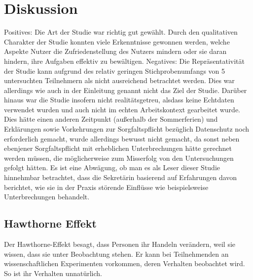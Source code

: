 \section{Diskussion}



Positives: Die Art der Studie war richtig gut gewählt. Durch den qualitativen Charakter der Studie konnten viele Erkenntnisse gewonnen werden, welche Aspekte Nutzer die Zufriedenstellung des Nutzers mindern oder sie daran hindern, ihre Aufgaben effektiv zu bewältigen. 
Negatives: Die Repräsentativität der Studie kann aufgrund des relativ geringen Stichprobenumfangs von 5 untersuchten Teilnehmern als nicht ausreichend betrachtet werden. Dies war allerdings wie auch in der Einleitung genannt nicht das Ziel der Studie. 
Darüber hinaus war die Studie insofern nicht realitätsgetreu, alsdass keine Echtdaten verwendet wurden und auch nicht im echten Arbeitskontext gearbeitet wurde. Dies hätte einen anderen Zeitpunkt (außerhalb der Sommerferien) und Erklärungen sowie Vorkehrungen zur Sorgfaltspflicht bezüglich Datenschutz noch erforderlich gemacht, wurde allerdings bewusst nicht gemacht, da sonst neben ebenjener Sorgfaltspflicht mit erheblichen Unterbrechungen hätte gerechnet werden müssen, die möglicherweise zum Misserfolg von den Untersuchungen gefolgt hätten. Es ist eine Abwägung, ob man es als Leser dieser Studie hinnehmbar betrachtet, dass die Sekretärin basierend auf Erfahrungen davon berichtet, wie sie in der Praxis störende Einflüsse wie beispielsweise Unterbrechungen behandelt.


\subsection{Hawthorne Effekt}
Der Hawthorne-Effekt besagt, dass Personen ihr Handeln verändern, weil sie wissen, dass sie unter Beobachtung stehen. Er kann bei Teilnehmenden an wissenschaftlichen Experimenten vorkommen, deren Verhalten beobachtet wird. So ist ihr Verhalten unnatürlich.

